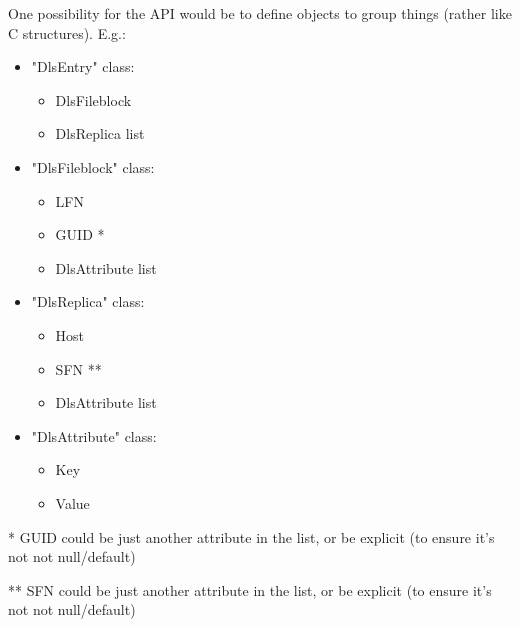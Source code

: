 \documentclass[pdftex]{cmspaper}
\begin{document}
One possibility for the API would be to define objects to group things (rather
like C structures). E.g.:
\begin{itemize}                                                                                                                   
\item "DlsEntry" class:
  \begin{itemize} 
  \item DlsFileblock
  \item DlsReplica list
   \end{itemize}                                                                                                                                             
\item "DlsFileblock" class:
   \begin{itemize}
   \item LFN
   \item GUID *
   \item DlsAttribute list
   \end{itemize}                                                                                                                                            
\item "DlsReplica" class:
   \begin{itemize}
   \item Host
   \item SFN **
   \item DlsAttribute list
   \end{itemize}                                                                                                                                             
\item "DlsAttribute" class:
   \begin{itemize}
   \item Key
   \item Value
   \end{itemize}
\end{itemize}                                                                                                                                                                                                                                                                
* GUID could be just another attribute in the list, or be explicit (to ensure it's not not null/default)

** SFN could be just another attribute in the list, or be explicit (to ensure it's not not null/default)
                                                                                                                                               
\end{document}
